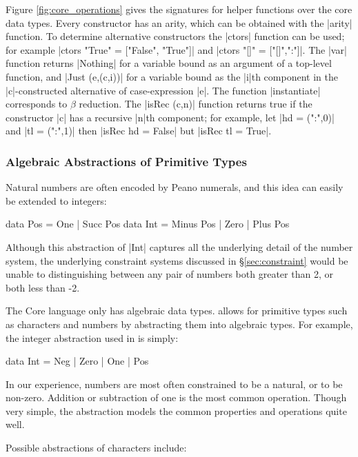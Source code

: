 Figure \ref{fig:core_operations} gives the signatures for helper functions over the core data types. Every constructor has an arity, which can be obtained with the |arity| function. To determine alternative constructors the |ctors| function can be used; for example |ctors "True" = ["False", "True"]| and |ctors "[]" = ["[]",":"]|. The |var| function returns |Nothing| for a variable bound as an argument of a top-level function, and |Just (e,(c,i))| for a variable bound as the |i|th component in the |c|-constructed alternative of case-expression |e|. The function |instantiate| corresponds to $\beta$ reduction. The |isRec (c,n)| function returns true if the constructor |c| has a recursive |n|th component; for example, let |hd = (":",0)| and |tl = (":",1)| then |isRec hd = False| but |isRec tl = True|.

\subsubsection{Algebraic Abstractions of Primitive Types}
\label{sec:abstraction}

Natural numbers are often encoded by Peano numerals, and this idea can easily be extended to integers:

\begin{code}
data Pos  = One | Succ Pos
data Int  = Minus Pos | Zero | Plus Pos
\end{code}

Although this abstraction of |Int| captures all the underlying detail of the number system, the underlying constraint systems discussed in \S\ref{sec:constraint} would be unable to distinguishing between any pair of numbers both greater than 2, or both less than -2.

The Core language only has algebraic data types. \catch{} allows for primitive types such as characters and numbers by abstracting them into algebraic types. For example, the integer abstraction used in \catch{} is simply:

\begin{code}
data Int = Neg | Zero | One | Pos
\end{code}

In our experience, numbers are most often constrained to be a natural, or to be non-zero. Addition or subtraction of one is the most common operation. Though very simple, the abstraction models the common properties and operations quite well.

Possible abstractions of characters include:

